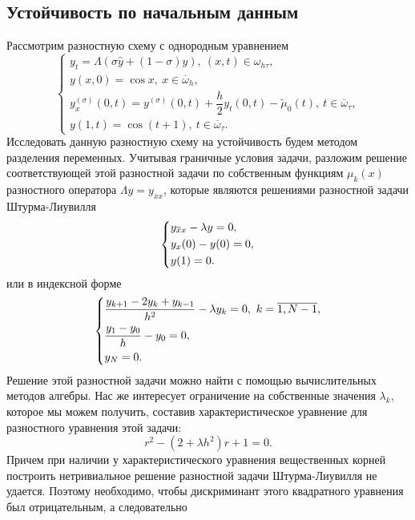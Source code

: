 \documentclass[a4paper, 12pt]{article}
\begin{document}
    \subsection*{Устойчивость по начальным данным}
    Рассмотрим разностную схему с однородным уравнением
    \begin{equation}
    	\begin{cases}
    		y_t = \Lambda(\sigma \hat y + (1-\sigma)y),\ (x,t)\in \omega_{h\tau},\\
    		y(x,0) = \cos x,\ x \in \overline \omega_h,\\
    		y_x^{(\sigma)}(0,t) = y^{(\sigma)}(0,t) + \dfrac h2 y_t(0,t) - \tilde \mu_0(t),\ t \in \overline \omega_\tau,\\ 
    		y(1,t) = \cos(t+1),\ t \in \overline \omega_\tau.
    	\end{cases}
    \end{equation}
    Исследовать данную разностную схему на устойчивость будем методом разделения переменных. Учитывая граничные условия задачи, разложим решение соответствующей этой разностной задачи по собственным функциям $\mu_k(x)$ разностного оператора $\Lambda y = y_{\overline x x}$, которые являются решениями разностной задачи Штурма-Лиувилля
    \begin{equation*}\begin{dcases}
    		y_{\overline x x} - \lambda y = 0,\\
    		y_x(0)- y(0) = 0,\\
    		y(1) = 0.
    	\end{dcases}
    \end{equation*}
    или в индексной форме
    \begin{equation*}
    	\begin{dcases}
    		\dfrac{y_{k+1} - 2y_k + y_{k-1}}{h^2} - \lambda y_k= 0,\ k = \overline{1, N-1},\\
    		\dfrac{y_1 - y_0}{h} - y_0 = 0,\\
    		y_N = 0.
    	\end{dcases}
    \end{equation*}
    Решение этой разностной задачи можно найти с помощью вычислительных методов алгебры. Нас же интересует ограничение на собственные значения $\lambda_k$, которое мы можем получить, составив характеристическое уравнение для разностного уравнения этой задачи:
    \begin{equation*}
    	r^2 - (2+\lambda h^2) r + 1 = 0.
    \end{equation*}
    Причем при наличии у характеристического уравнения вещественных корней построить нетривиальное решение разностной задачи Штурма-Лиувилля не удается. Поэтому необходимо, чтобы дискриминант этого квадратного уравнения был отрицательным, а следовательно
\end{document}
